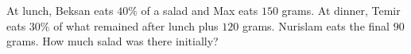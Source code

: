 At lunch, Beksan eats $40\%$ of a salad and Max eats $150$ grams. At dinner, Temir eats $30\%$ of what remained after lunch plus $120$ grams. Nurislam eats the final $90$ grams. How much salad was there initially?
